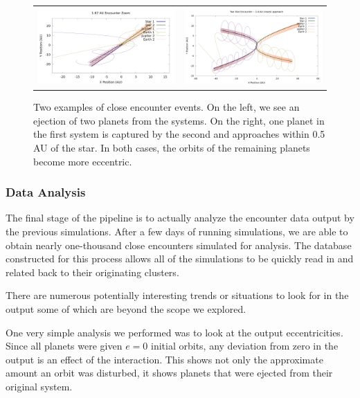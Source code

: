 \documentclass[12pt]{article}
\begin{document}
    \begin{figure}[H]
        \centering
        \caption{Two examples of close encounter events. On the left, we see
            an ejection of two planets from the systems. On the right, one planet
            in the first system is captured by the second and approaches 
            within 0.5 AU of the star. In both cases, the
            orbits of the remaining planets become more eccentric.
        }
        \label{fig:planet_simulations}
        \begin{tabular}{cc}
            \includegraphics[width=3in]{1_67_AU_zoom} &
            \includegraphics[width=3in]{1.4AU/1_4_AU_encounter_plot}
        \end{tabular}
    \end{figure}

    \subsubsection{Data Analysis}

    The final stage of the pipeline is to actually analyze the encounter data 
    output by the previous simulations. After a few days of running simulations,
    we are able to obtain nearly one-thousand close encounters simulated
    for analysis. The database constructed for this process allows all of the
    simulations to be quickly read in and related back to their originating clusters.

    There are numerous potentially interesting trends or situations to look for in
    the output some of which are beyond the scope we explored. 
    
    One very simple analysis we performed was to look at the output
    eccentricities. Since all planets were given $e=0$ initial orbits, any deviation
    from zero in the output is an effect of the interaction. This shows not only the
    approximate amount an orbit was disturbed, it shows planets that were ejected
    from their original system.
\end{document}
